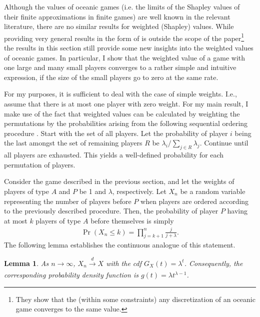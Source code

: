 \documentclass[a4paper]{article}
\newtheorem{lemma}{Lemma}
\begin{document}
Although the values of oceanic games (i.e. the limits of the Shapley values of their finite approximations in finite games) are well known in the relevant literature, there are no similar results for weighted (Shapley) values.
While providing very general results in the form of \textcite[]{fogelman1980asymptotic} is outside the scope of the paper\footnote{
    They show that the (within some constraints) any discretization of an oceanic game converges to the same value.
} the results in this section still provide some new insights into the weighted values of oceanic games.
In particular, I show that the weighted value of a game with one large and many small players converges to a rather simple and intuitive expression, if the size of the small players go to zero at the same rate.

For my purposes, it is sufficient to deal with the case of simple weights.
I.e., assume that there is at most one player with zero weight.
For my main result, I make use of the fact that weighted values can be calculated by weighting the permutations by the probabilities arising from the following sequential ordering procedure \parencite{kalai1987weighted}.
Start with the set of all players.
Let the probability of player $i$ being the last amongst the set of remaining players $R$ be $\lambda_i / \sum_{j \in R} \lambda_j$.
Continue until all players are exhausted.
This yields a well-defined probability for each permutation of players.

Consider the game described in the previous section, and let the weights of players of type $A$ and $P$ be 1 and $\lambda$, respectively.
Let $X_n$ be a random variable representing the number of players before $P$ when players are ordered according to the previously described procedure.
Then, the probability of player $P$ having at most $k$ players of type $A$ before themselves is simply
\begin{align*}
    \Pr(X_n \leq k) = \prod_{j=k+1}^n \frac{j}{j + \lambda} .
\end{align*}
The following lemma establishes the continuous analogue of this statement.
\begin{lemma}
    \label{lem:entry_distr}
     As $n \to \infty$, $X_n \xrightarrow[]{d} X$ with the cdf $G_X(t) = \lambda^t$.
     Consequently, the corresponding probability density function is $g(t) = \lambda t^{\lambda - 1}$.
\end{lemma}
\end{document}
